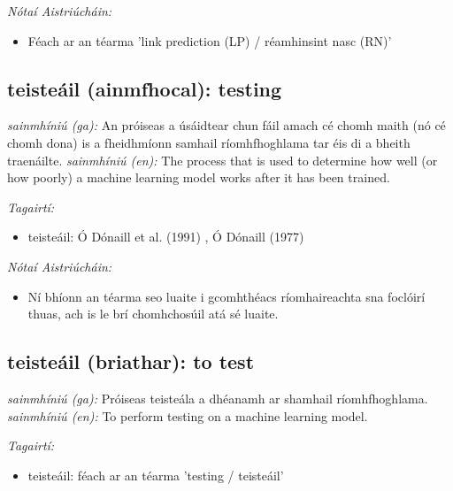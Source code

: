 \documentclass{article}
\begin{document}
 \noindent \textit{Nótaí Aistriúcháin:}
\begin{itemize}
	\item Féach ar an téarma 'link prediction (LP) / réamhinsint nasc (RN)'
\end{itemize}


\subsection*{teisteáil (ainmfhocal): testing} 
 \noindent \textit{sainmhíniú (ga):} An próiseas a úsáidtear chun fáil amach cé chomh maith (nó cé chomh dona) is a fheidhmíonn samhail ríomhfhoghlama tar éis di a bheith traenáilte.
\newline\newline
 \noindent \textit{sainmhíniú (en):} The process that is used to determine how well (or how poorly) a machine learning model works after it has been trained.
\newline

 \noindent \textit{Tagairtí:}
\begin{itemize}
	\item teisteáil: Ó Dónaill et al. (1991) \cite{focloir-beag}, Ó Dónaill (1977) \cite{odonaill}
\end{itemize}

 \noindent \textit{Nótaí Aistriúcháin:}
\begin{itemize}
	\item Ní bhíonn an téarma seo luaite i gcomhthéacs ríomhaireachta sna foclóirí thuas, ach is le brí chomhchosúil atá sé luaite.
\end{itemize}


\subsection*{teisteáil (briathar): to test} 
 \noindent \textit{sainmhíniú (ga):} Próiseas teisteála a dhéanamh ar shamhail ríomhfhoghlama.
\newline\newline
 \noindent \textit{sainmhíniú (en):} To perform testing on a machine learning model.
\newline

 \noindent \textit{Tagairtí:}
\begin{itemize}
	\item teisteáil: féach ar an téarma 'testing / teisteáil'
\end{itemize}
\end{document}
